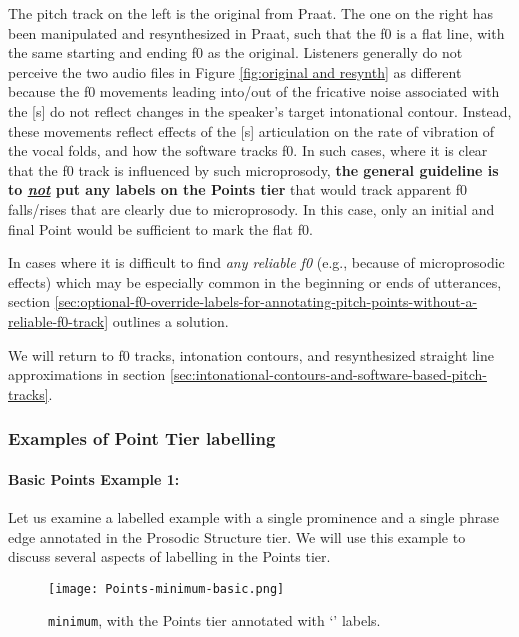 The pitch track on the left is the original from Praat. The one on the right has been manipulated and resynthesized in Praat, such that the f0 is a flat line, with the same starting and ending f0 as the original. Listeners generally do not perceive the two audio files in Figure \ref{fig:original and resynth} as different because the f0 movements leading into\slash out of the fricative noise associated with the [s] do not reflect changes in the speaker’s target intonational contour.  Instead, these movements reflect effects of the [s] articulation on the rate of vibration of the vocal folds, and how the software tracks f0. In such cases, where it is clear that the f0 track is influenced by such microprosody, \textbf{the general guideline is to \textit{\uline{not}} put any labels on the Points tier} that would track apparent f0 falls\slash rises that are clearly due to microprosody. In this case, only an initial and final Point would be sufficient to mark the flat f0.

In cases where it is difficult to find \textit{any reliable f0} (e.g., because of microprosodic effects) which may be especially common in the beginning or ends of utterances, section \ref{sec:optional-f0-override-labels-for-annotating-pitch-points-without-a-reliable-f0-track} outlines a solution.

We will return to f0 tracks, intonation contours, and resynthesized straight line approximations in section \ref{sec:intonational-contours-and-software-based-pitch-tracks}.

\subsubsection{Examples of Point Tier labelling}\label{sec:examples-of-point-tier-labelling}

\paragraph{Basic Points Example 1:\label{basic-points-example-1}}

Let us examine a labelled example with a single prominence and a single phrase edge annotated in the Prosodic Structure tier. We will use this example to discuss several aspects of labelling in the Points tier.

\begin{figure}[H]
\centering
%
\texttt{[image: Points-minimum-basic.png]}
%
\caption{\texttt{minimum}, with the Points tier annotated with ‘’ labels.%
\label{fig:minimum Points basic}%
%
}
\end{figure}

